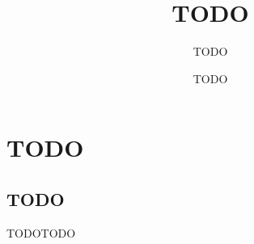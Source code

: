 \documentclass[compress]{beamer}
\begin{document}
 
\title{TODO}
\subtitle{TODO}
\author{TODO}
\maketitle
 
\begin{frame}
	\tableofcontents
\end{frame}

\section{TODO}
\subsection{TODO}
\begin{frame}[allowframebreaks]{TODO}{TODO}
\end{frame}
\end{document}
